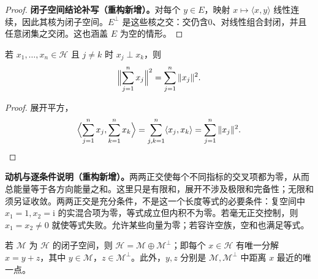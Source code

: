 \documentclass[../../main.tex]{subfiles}
\begin{document}
\begin{proof}
\textbf{闭子空间结论补写（重构新增）。}对每个 $y\in E$，映射 $x\mapsto\langle x,y\rangle$ 线性连续，因此其核为闭子空间。$E^\perp$ 是这些核之交：交仍含0、对线性组合封闭，并且任意闭集之交闭。这也涵盖 $E$ 为空的情形。
\end{proof}
\begin{theorem}[Pythagoras 定理]\label{theorem:ch05-pythagorean}
若 $x_1,\ldots,x_n\in\mathscr H$ 且 $j\ne k$ 时 $x_j\perp x_k$，则
\begin{align*}
\Bigl\|\sum_{j=1}^nx_j\Bigr\|^2=\sum_{j=1}^n\|x_j\|^2.
\end{align*}
\end{theorem}
\begin{proof}
展开平方，
\begin{align*}
\Bigl\langle\sum_{j=1}^nx_j,\sum_{k=1}^nx_k\Bigr\rangle
=\sum_{j,k=1}^n\langle x_j,x_k\rangle=\sum_{j=1}^n\|x_j\|^2.
\end{align*}
\end{proof}
\begin{remark}
\textbf{动机与逐条件说明（重构新增）。}两两正交使每个不同指标的交叉项都为零，从而总能量等于各方向能量之和。这里只是有限和，展开不涉及极限和完备性；无限和须另证收敛。两两正交是充分条件，不是这一个长度等式的必要条件：复空间中 $x_1=1,x_2=\mathrm i$ 的实混合项为零，等式成立但内积不为零。若毫无正交控制，则 $x_1=x_2\ne0$ 就使等式失败。允许某些向量为零；若容许空族，空和也满足等式。
\end{remark}
\begin{theorem}\label{theorem:ch05-orthogonal-decomposition}
若 $\mathscr M$ 为 $\mathscr H$ 的闭子空间，则 $\mathscr H=\mathscr M\oplus\mathscr M^\perp$；即每个 $x\in\mathscr H$ 有唯一分解 $x=y+z$，其中 $y\in\mathscr M$，$z\in\mathscr M^\perp$。此外，$y,z$ 分别是 $\mathscr M,\mathscr M^\perp$ 中距离 $x$ 最近的唯一点。
\end{theorem}
\end{document}
